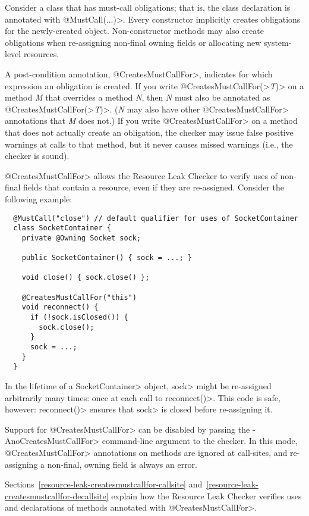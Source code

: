 Consider a class that has must-call obligations; that is, the class
declaration is annotated with \<@MustCall(...)>.
Every constructor implicitly creates obligations for the newly-created object.
Non-constructor methods may also create obligations
when re-assigning non-final owning fields or allocating
new system-level resources.

A post-condition annotation,
\<@CreatesMustCallFor>,
indicates for which expression an obligation is created.
If you write \<@CreatesMustCallFor(>\emph{T}\<)> on a method \emph{M} that
overrides a method \emph{N}, then \emph{N} must also be annotated as
\<@CreatesMustCallFor(>\emph{T}\<)>.  (\emph{N} may also have other
\<@CreatesMustCallFor> annotations that \emph{M} does not.)
If you write \<@CreatesMustCallFor> on a method that does not actually
create an obligation, the checker may issue false positive warnings at calls to
that method, but it never causes
missed warnings (i.e., the checker is sound).

\<@CreatesMustCallFor> allows the Resource Leak Checker to verify uses of non-final fields
that contain a resource, even if they are re-assigned. Consider
the following example:

\begin{verbatim}
  @MustCall("close") // default qualifier for uses of SocketContainer
  class SocketContainer {
    private @Owning Socket sock;

    public SocketContainer() { sock = ...; }

    void close() { sock.close() };

    @CreatesMustCallFor("this")
    void reconnect() {
      if (!sock.isClosed()) {
        sock.close();
      }
      sock = ...;
    }
  }
\end{verbatim}

In the lifetime of a \<SocketContainer> object, \<sock>
might be re-assigned arbitrarily many times: once at each
call to \<reconnect()>. This code is safe, however: \<reconnect()>
ensures that \<sock> is closed before re-assigning it.

Support for \<@CreatesMustCallFor> can be disabled by passing the \<-AnoCreatesMustCallFor> command-line
argument to the checker. In this mode, \<@CreatesMustCallFor> annotations on methods are ignored at call-sites,
and re-assigning a non-final, owning field is always an error.

Sections~\ref{resource-leak-createsmustcallfor-callsite}
and~\ref{resource-leak-createsmustcallfor-decallsite}
explain how the Resource Leak Checker verifies uses and declarations of
methods annotated with \<@CreatesMustCallFor>.


